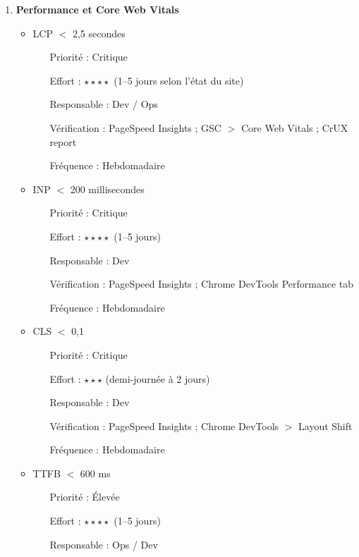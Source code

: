\documentclass[12pt,a4paper,twoside]{report}
\begin{document}
\begin{enumerate}
    \item \textbf{Performance et Core Web Vitals}
    \begin{itemize}
        \item LCP $<$ 2,5 secondes
        \begin{itemize}
            \item[Priorité :] Critique
            \item[Effort :] $\star\star\star\star$ (1--5 jours selon l'état du site)
            \item[Responsable :] Dev / Ops
            \item[Vérification :] PageSpeed Insights ; GSC $>$ Core Web Vitals ; CrUX report
            \item[Fréquence :] Hebdomadaire
        \end{itemize}
        \item INP $<$ 200 millisecondes
        \begin{itemize}
            \item[Priorité :] Critique
            \item[Effort :] $\star\star\star\star$ (1--5 jours)
            \item[Responsable :] Dev
            \item[Vérification :] PageSpeed Insights ; Chrome DevTools Performance tab
            \item[Fréquence :] Hebdomadaire
        \end{itemize}
        \item CLS $<$ 0,1
        \begin{itemize}
            \item[Priorité :] Critique
            \item[Effort :] $\star\star\star$ (demi-journée à 2 jours)
            \item[Responsable :] Dev
            \item[Vérification :] PageSpeed Insights ; Chrome DevTools $>$ Layout Shift
            \item[Fréquence :] Hebdomadaire
        \end{itemize}
        \item TTFB $<$ 600 ms
        \begin{itemize}
            \item[Priorité :] Élevée
            \item[Effort :] $\star\star\star\star$ (1--5 jours)
            \item[Responsable :] Ops / Dev

\end{itemize}
\end{itemize}
\end{enumerate}
\end{document}
